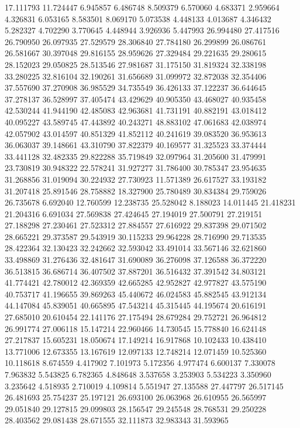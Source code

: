 17.111793
11.724447
6.945857
6.486748
8.509379
6.570060
4.683371
2.959664
4.326831
6.053165
8.583501
8.069170
5.073538
4.448133
4.013687
4.346432
5.282327
4.702290
3.770645
4.448944
3.926936
5.447993
26.994480
27.417516
26.790950
26.097935
27.529579
28.306840
27.784180
26.299899
26.086761
26.581667
30.397048
29.816155
28.959626
27.329484
29.221635
29.280615
28.152023
29.050825
28.513546
27.981687
31.175150
31.819324
32.338198
33.280225
32.816104
32.190261
31.656689
31.099972
32.872038
32.354406
37.557690
37.270908
36.985529
34.735549
36.426133
37.122237
36.644645
37.278137
36.528997
37.405474
43.429629
40.905350
43.468027
40.935458
42.530244
41.944190
42.485083
42.963681
41.731191
40.882191
43.018412
40.095227
43.589745
47.443892
40.243271
48.883102
47.061683
42.038974
42.057902
43.014597
40.851329
41.852112
40.241619
39.083520
36.953613
36.063037
39.148661
43.310790
37.822379
40.169577
31.325523
33.374444
33.441128
32.482335
29.822288
35.719849
32.097964
31.205600
31.479991
23.730819
30.948322
22.578241
31.927277
31.786400
30.785347
23.954635
31.268856
31.019094
30.224932
27.730923
11.571389
26.617527
33.193182
31.207418
25.891546
28.758882
18.327900
25.780489
30.834384
29.759026
26.735678
6.692040
12.760599
12.238735
25.528042
8.188023
14.011445
21.418231
21.204316
6.691034
27.569838
27.424645
27.194019
27.500791
27.219151
27.188298
27.230461
27.523312
27.884557
27.616922
29.837398
29.071502
28.665221
29.373587
29.543919
30.115233
29.964228
28.716990
29.713535
28.422364
32.130423
32.242662
32.593042
33.491014
33.567146
32.621860
33.498869
31.276436
32.481647
31.690089
36.276098
37.126588
36.372220
36.513815
36.686714
36.407502
37.887201
36.516432
37.391542
34.803121
41.774421
42.780012
42.369359
42.665285
42.952827
42.977827
43.575190
40.753717
41.196655
39.869263
45.440672
46.024583
45.882545
43.912134
44.147084
45.839051
40.665895
47.543214
45.315445
44.195674
20.616191
27.685010
20.610454
22.141176
27.175494
28.679284
29.752721
26.964812
26.991774
27.006118
15.147214
22.960466
14.730545
15.778840
16.624148
27.217837
15.605231
18.050674
17.149214
16.917868
10.102433
10.438410
13.771006
12.673355
13.167619
12.097133
12.748214
12.071459
10.525360
10.118618
8.674559
4.417902
7.101973
5.172356
4.977474
6.600137
7.330078
7.963832
5.543825
6.782365
4.848648
3.537658
3.253903
5.534223
3.350960
3.235642
4.518935
2.710019
4.109814
5.551947
27.135588
27.447797
26.517145
26.481693
25.754237
25.197121
26.693100
26.063968
26.610955
26.565997
29.051840
29.127815
29.099803
28.156547
29.245548
28.768531
29.250228
28.403562
29.081438
28.671555
32.111873
32.983343
31.593965
